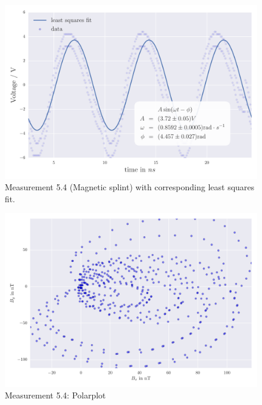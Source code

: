 \begin{figure}[H]
    \centering
    \includegraphics[width=0.7\linewidth]{analysis/figures/fit5_4}
    \caption{Measurement 5.4 (Magnetic splint) with corresponding least squares fit.}
    \label{fig:5_4_plot}
\end{figure}
\begin{figure}[H]
    \centering
    \includegraphics[width=0.7\linewidth]{analysis/figures/polar5_4}
    \caption{Measurement 5.4: Polarplot}
    \label{fig:5_4_polar}
\end{figure}

